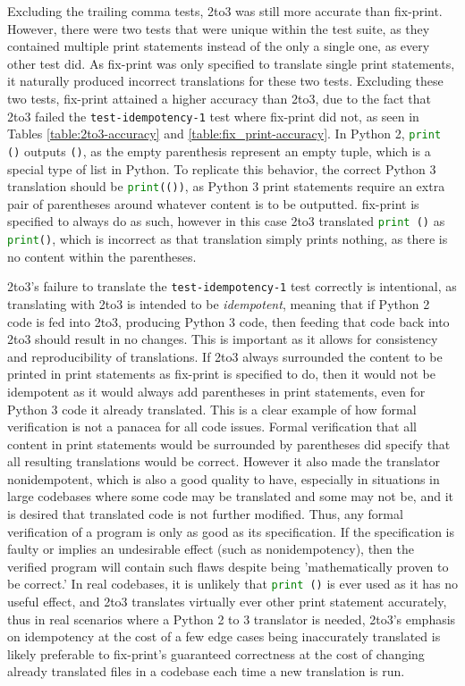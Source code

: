 Excluding the trailing comma tests, 2to3 was still more accurate than fix-print. However, there were two tests that were unique within the test suite, as they contained multiple print statements instead of the only a single one, as every other test did. As fix-print was only specified to translate single print statements, it naturally produced incorrect translations for these two tests. Excluding these two tests, fix-print attained a higher accuracy than 2to3, due to the fact that 2to3 failed the \verb|test-idempotency-1| test where fix-print did not, as seen in Tables \ref{table:2to3-accuracy} and \ref{table:fix_print-accuracy}. In Python 2, \lstinline[language=Python, style=pythonstyle]|print ()| outputs \verb|()|, as the empty parenthesis represent an empty tuple, which is a special type of list in Python. To replicate this behavior, the correct Python 3 translation should be \lstinline[language=Python, style=pythonstyle]|print(())|, as Python 3 print statements require an extra pair of parentheses around whatever content is to be outputted. fix-print is specified to always do as such, however in this case 2to3 translated \lstinline[language=Python, style=pythonstyle]|print ()| as \lstinline[language=Python, style=pythonstyle]|print()|, which is incorrect as that translation simply prints nothing, as there is no content within the parentheses.

2to3's failure to translate the \verb|test-idempotency-1| test correctly is intentional, as translating with 2to3 is intended to be \textit{idempotent}, meaning that if Python 2 code is fed into 2to3, producing Python 3 code, then feeding that code back into 2to3 should result in no changes. This is important as it allows for consistency and reproducibility of translations. If 2to3 always surrounded the content to be printed in print statements as fix-print is specified to do, then it would not be idempotent as it would always add parentheses in print statements, even for Python 3 code it already translated. This is a clear example of how formal verification is not a panacea for all code issues. Formal verification that all content in print statements would be surrounded by parentheses did specify that all resulting translations would be correct. However it also made the translator nonidempotent, which is also a good quality to have, especially in situations in large codebases where some code may be translated and some may not be, and it is desired that translated code is not further modified. Thus, any formal verification of a program is only as good as its specification. If the specification is faulty or implies an undesirable effect (such as nonidempotency), then the verified program will contain such flaws despite being 'mathematically proven to be correct.' In real codebases, it is unlikely that \lstinline[language=Python, style=pythonstyle]|print ()| is ever used as it has no useful effect, and 2to3 translates virtually ever other print statement accurately, thus in real scenarios where a Python 2 to 3 translator is needed, 2to3's emphasis on idempotency at the cost of a few edge cases being inaccurately translated is likely preferable to fix-print's guaranteed correctness at the cost of changing already translated files in a codebase each time a new translation is run.

